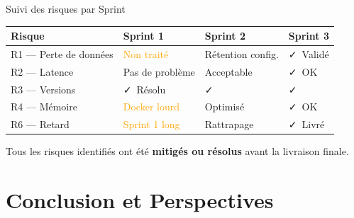 \documentclass[aspectratio=169, 12pt]{beamer}
\begin{document}
\begin{frame}{Suivi des risques par Sprint}
  \centering\footnotesize
  \begin{tabular}{L{4cm} C{2.5cm} C{2.5cm} C{2.5cm}}
    \toprule
    \textbf{Risque} & \textbf{Sprint 1} & \textbf{Sprint 2} & \textbf{Sprint 3} \\
    \midrule
    R1 — Perte de données & \textcolor{orange}{Non traité} & \textcolor{kappaGreen}{Rétention config.} & \textcolor{kappaGreen}{\faCheck\ Validé} \\[4pt]
    R2 — Latence & \textcolor{kappaGreen}{Pas de problème} & \textcolor{kappaGreen}{Acceptable} & \textcolor{kappaGreen}{\faCheck\ OK} \\[4pt]
    R3 — Versions & \textcolor{kappaGreen}{\faCheck\ Résolu} & \textcolor{kappaGreen}{\faCheck} & \textcolor{kappaGreen}{\faCheck} \\[4pt]
    R4 — Mémoire & \textcolor{orange}{Docker lourd} & \textcolor{kappaGreen}{Optimisé} & \textcolor{kappaGreen}{\faCheck\ OK} \\[4pt]
    R6 — Retard & \textcolor{orange}{Sprint 1 long} & \textcolor{kappaGreen}{Rattrapage} & \textcolor{kappaGreen}{\faCheck\ Livré} \\
    \bottomrule
  \end{tabular}

  \vspace{0.4cm}
  \begin{exampleblock}{}
    \centering\small
    Tous les risques identifiés ont été \textbf{mitigés ou résolus} avant la livraison finale.
  \end{exampleblock}
\end{frame}

\section{Conclusion et Perspectives}
\end{document}
